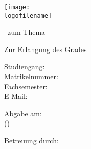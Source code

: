 
\begin{titlepage}

   \singlespacing

   \begin{center} \large 
    
    \universityname
    \vspace*{0.5cm}
    
    \facultyname
    \vspace*{1.5cm}
    
	\texttt{[image: \\logofilename]}
    \vspace*{2cm} 

	\thesistype \ zum Thema
	\vspace*{0.5cm}
	
    {\huge\textbf{\thesistitle}}
    \vspace*{1.5cm}
    
    
  	Zur Erlangung des Grades \studygoal
  	\vspace*{1.5cm}

    \textbf{\thesisauthor}
    \vspace*{0.5cm}
    
    Studiengang: \studytype \\
    Matrikelnummer: \studentnumber \\
    Fachsemester: \semesternumber \\
    E-Mail: \mail \\
    \vspace*{2.0cm}

    Abgabe am: \submissiondate \\
    (\semester)
    \vspace*{1.5cm}

    Betreuung durch: \supervisor
  \end{center}
\end{titlepage}

\restoregeometry